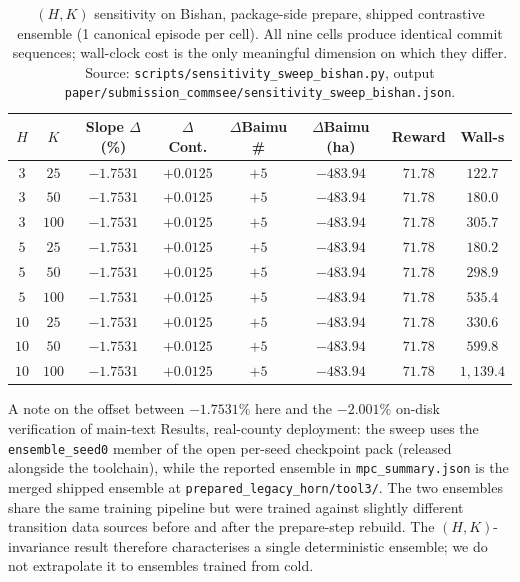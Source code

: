 \documentclass[11pt]{article}
\begin{document}
\begin{table}[htbp]
\centering
\small
\caption{$(H, K)$ sensitivity on Bishan, package-side prepare, shipped contrastive ensemble (1 canonical episode per cell). All nine cells produce identical commit sequences; wall-clock cost is the only meaningful dimension on which they differ. Source: \texttt{scripts/sensitivity\_sweep\_bishan.py}, output \texttt{paper/submission\_commsee/sensitivity\_sweep\_bishan.json}.}
\label{tab:si-hk-sweep}
\begin{tabular}{cccccccc}
\toprule
$H$ & $K$ & Slope $\Delta$ (\%) & $\Delta$Cont. & $\Delta$Baimu \# & $\Delta$Baimu (ha) & Reward & Wall-s \\
\midrule
$3$  & $25$  & $-1.7531$ & $+0.0125$ & $+5$ & $-483.94$ & $71.78$ & $122.7$ \\
$3$  & $50$  & $-1.7531$ & $+0.0125$ & $+5$ & $-483.94$ & $71.78$ & $180.0$ \\
$3$  & $100$ & $-1.7531$ & $+0.0125$ & $+5$ & $-483.94$ & $71.78$ & $305.7$ \\
$5$  & $25$  & $-1.7531$ & $+0.0125$ & $+5$ & $-483.94$ & $71.78$ & $180.2$ \\
$5$  & $50$  & $-1.7531$ & $+0.0125$ & $+5$ & $-483.94$ & $71.78$ & $298.9$ \\
$5$  & $100$ & $-1.7531$ & $+0.0125$ & $+5$ & $-483.94$ & $71.78$ & $535.4$ \\
$10$ & $25$  & $-1.7531$ & $+0.0125$ & $+5$ & $-483.94$ & $71.78$ & $330.6$ \\
$10$ & $50$  & $-1.7531$ & $+0.0125$ & $+5$ & $-483.94$ & $71.78$ & $599.8$ \\
$10$ & $100$ & $-1.7531$ & $+0.0125$ & $+5$ & $-483.94$ & $71.78$ & $1{,}139.4$ \\
\bottomrule
\end{tabular}
\end{table}

A note on the offset between $-1.7531\%$ here and the $-2.001\%$ on-disk verification of main-text Results, real-county deployment: the sweep uses the \texttt{ensemble\_seed0} member of the open per-seed checkpoint pack (released alongside the toolchain), while the reported ensemble in \texttt{mpc\_summary.json} is the merged shipped ensemble at \texttt{prepared\_legacy\_horn/tool3/}. The two ensembles share the same training pipeline but were trained against slightly different transition data sources before and after the prepare-step rebuild. The $(H, K)$-invariance result therefore characterises a single deterministic ensemble; we do not extrapolate it to ensembles trained from cold.
\end{document}
